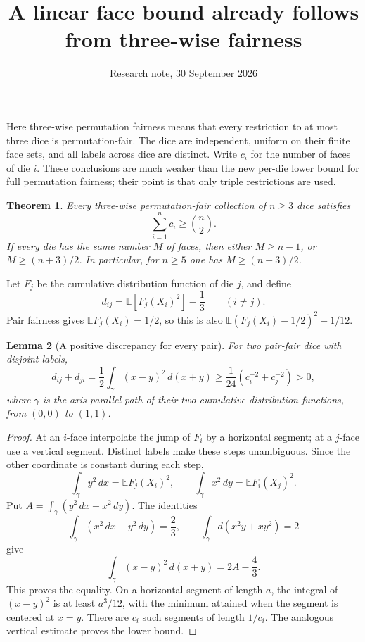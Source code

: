 \documentclass[11pt]{article}
\title{A linear face bound already follows from three-wise fairness}
\author{Research note, 30 September 2026}
\date{}
\newtheorem{theorem}{Theorem}
\newtheorem{lemma}[theorem]{Lemma}
\begin{document}
\maketitle

Here three-wise permutation fairness means that every restriction to at
most three dice is permutation-fair. The dice are independent, uniform on
their finite face sets, and all labels across dice are distinct. Write
$c_i$ for the number of faces of die $i$. These conclusions are much weaker
than the new per-die lower bound for full permutation fairness; their point
is that only triple restrictions are used.

\begin{theorem}\label{thm:main}
Every three-wise permutation-fair collection of $n\ge3$ dice satisfies
\[
 \sum_{i=1}^n c_i\ge\binom n2.
\]
If every die has the same number $M$ of faces, then either $M\ge n-1$,
or $M\ge(n+3)/2$. In particular, for $n\ge5$ one has
$M\ge(n+3)/2$.
\end{theorem}

Let $F_j$ be the cumulative distribution function of die $j$, and define
\[
 d_{ij}=\mathbb E[F_j(X_i)^2]-\frac13\qquad(i\ne j).
\]
Pair fairness gives $\mathbb E F_j(X_i)=1/2$, so this is also
$\mathbb E(F_j(X_i)-1/2)^2-1/12$.

\begin{lemma}[A positive discrepancy for every pair]\label{lem:path}
For two pair-fair dice with disjoint labels,
\[
 d_{ij}+d_{ji}
 =\frac12\int_\gamma(x-y)^2\,d(x+y)
 \ge\frac1{24}\left(c_i^{-2}+c_j^{-2}\right)>0,
\]
where $\gamma$ is the axis-parallel path of their two cumulative
distribution functions, from $(0,0)$ to $(1,1)$.
\end{lemma}
\begin{proof}
At an $i$-face interpolate the jump of $F_i$ by a horizontal segment;
at a $j$-face use a vertical segment. Distinct labels make these steps
unambiguous. Since the other coordinate is constant during each step,
\[
 \int_\gamma y^2\,dx=\mathbb E F_j(X_i)^2,
 \qquad
 \int_\gamma x^2\,dy=\mathbb E F_i(X_j)^2.
\]
Put $A=\int_\gamma(y^2\,dx+x^2\,dy)$. The identities
\[
 \int_\gamma(x^2\,dx+y^2\,dy)=\frac23,
 \qquad
 \int_\gamma d(x^2y+xy^2)=2
\]
give
\[
 \int_\gamma(x-y)^2\,d(x+y)=2A-\frac43.
\]
This proves the equality. On a horizontal segment of length $a$, the
integral of $(x-y)^2$ is at least $a^3/12$, with the minimum attained
when the segment is centered at $x=y$. There are $c_i$ such segments of
length $1/c_i$. The analogous vertical estimate proves the lower bound.
\end{proof}
\end{document}
